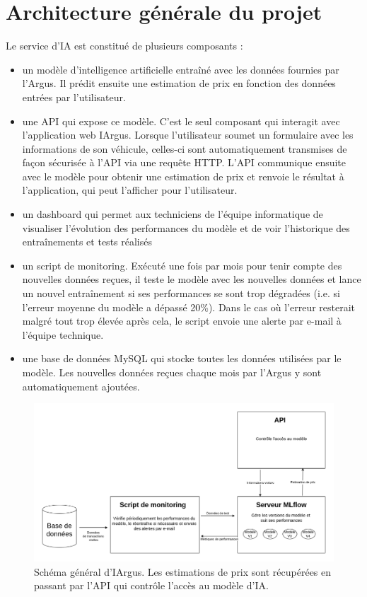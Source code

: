 \documentclass[french]{article}
\begin{document}
    \section{Architecture générale du projet}
    Le service d'IA est constitué de plusieurs composants :
    \begin{itemize}
        \item un modèle d'intelligence artificielle entraîné avec les données fournies par l'Argus. Il prédit ensuite une estimation de prix en fonction des données entrées par l'utilisateur.
        \item une API qui expose ce modèle. C'est le seul composant qui interagit avec l'application web IArgus. Lorsque l'utilisateur soumet un formulaire avec les informations de son véhicule, celles-ci sont automatiquement transmises de façon sécurisée à l'API via une requête HTTP. L'API communique ensuite avec le modèle pour obtenir une estimation de prix et renvoie le résultat à l'application, qui peut l'afficher pour l'utilisateur. 
        \item un dashboard qui permet aux techniciens de l'équipe informatique de visualiser l'évolution des performances du modèle et de voir l'historique des entraînements et tests réalisés
        \item un script de monitoring. Exécuté une fois par mois pour tenir compte des nouvelles données reçues, il teste le modèle avec les nouvelles données et lance un nouvel entraînement si ses performances se sont trop dégradées (i.e. si l'erreur moyenne du modèle a dépassé 20\%). Dans le cas où l'erreur resterait malgré tout trop élevée après cela, le script envoie une alerte par e-mail à l'équipe technique.
        \item une base de données MySQL qui stocke toutes les données utilisées par le modèle. Les nouvelles données reçues chaque mois par l'Argus y sont automatiquement ajoutées.
    \end{itemize}

    \begin{figure}[h!]
        \includegraphics[width=12cm]{architecture_E3}
        \centering
        \caption{Schéma général d'IArgus. Les estimations de prix sont récupérées en passant par l'API qui contrôle l'accès au modèle d'IA.}
        \centering
    \end{figure}
\end{document}
